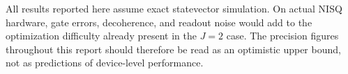 All results reported here assume exact statevector simulation. On actual NISQ hardware, gate errors, decoherence, and readout noise would add to the optimization difficulty already present in the $J=2$ case. The precision figures throughout this report should therefore be read as an optimistic upper bound, not as predictions of device-level performance.
